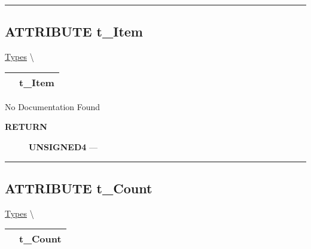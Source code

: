 \rule{\linewidth}{0.5pt}
\subsection*{\textsf{\colorbox{headtoc}{\color{white} ATTRIBUTE}
t\_Item}}

\hypertarget{ecldoc:ml_core.types.t_item}{}
\hspace{0pt} \hyperlink{ecldoc:ML_Core.Types}{Types} \textbackslash 

{\renewcommand{\arraystretch}{1.5}
\begin{tabularx}{\textwidth}{|>{\raggedright\arraybackslash}l|X|}
\hline
\hspace{0pt}\mytexttt{\color{red} } & \textbf{t\_Item} \\
\hline
\end{tabularx}
}

\par





No Documentation Found








\par
\begin{description}
\item [\colorbox{tagtype}{\color{white} \textbf{\textsf{RETURN}}}] \textbf{UNSIGNED4} --- 
\end{description}




\rule{\linewidth}{0.5pt}
\subsection*{\textsf{\colorbox{headtoc}{\color{white} ATTRIBUTE}
t\_Count}}

\hypertarget{ecldoc:ml_core.types.t_count}{}
\hspace{0pt} \hyperlink{ecldoc:ML_Core.Types}{Types} \textbackslash 

{\renewcommand{\arraystretch}{1.5}
\begin{tabularx}{\textwidth}{|>{\raggedright\arraybackslash}l|X|}
\hline
\hspace{0pt}\mytexttt{\color{red} } & \textbf{t\_Count} \\
\hline
\end{tabularx}
}

\par





